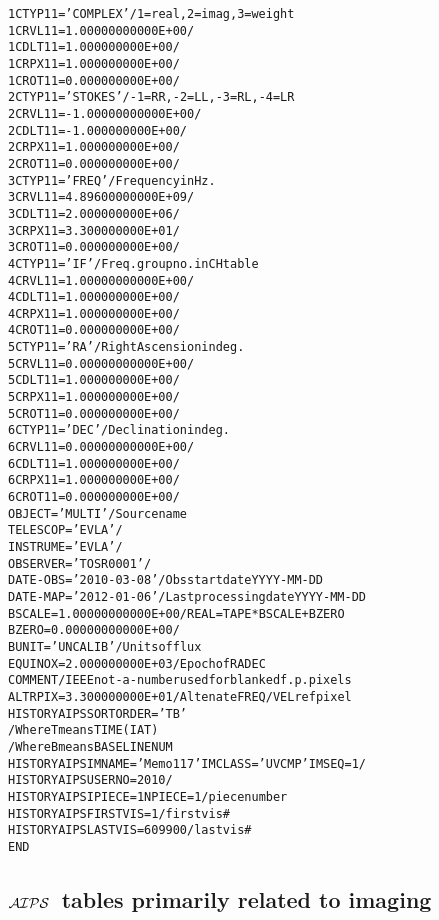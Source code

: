 \documentclass[twoside]{article}
\newcommand{\AIPS}{{$\cal AIPS\/$}}
\begin{document}
\begin{alltt}
1CTYP11 = 'COMPLEX '           / 1=real,2=imag,3=weight
1CRVL11 =    1.00000000000E+00 /
1CDLT11 =      1.000000000E+00 /
1CRPX11 =      1.000000000E+00 /
1CROT11 =      0.000000000E+00 /
2CTYP11 = 'STOKES  '           / -1=RR, -2=LL, -3=RL, -4=LR
2CRVL11 =   -1.00000000000E+00 /
2CDLT11 =     -1.000000000E+00 /
2CRPX11 =      1.000000000E+00 /
2CROT11 =      0.000000000E+00 /
3CTYP11 = 'FREQ    '           / Frequency in Hz.
3CRVL11 =    4.89600000000E+09 /
3CDLT11 =      2.000000000E+06 /
3CRPX11 =      3.300000000E+01 /
3CROT11 =      0.000000000E+00 /
4CTYP11 = 'IF      '           / Freq. group no. in CH table
4CRVL11 =    1.00000000000E+00 /
4CDLT11 =      1.000000000E+00 /
4CRPX11 =      1.000000000E+00 /
4CROT11 =      0.000000000E+00 /
5CTYP11 = 'RA      '           / Right Ascension in deg.
5CRVL11 =    0.00000000000E+00 /
5CDLT11 =      1.000000000E+00 /
5CRPX11 =      1.000000000E+00 /
5CROT11 =      0.000000000E+00 /
6CTYP11 = 'DEC     '           / Declination in deg.
6CRVL11 =    0.00000000000E+00 /
6CDLT11 =      1.000000000E+00 /
6CRPX11 =      1.000000000E+00 /
6CROT11 =      0.000000000E+00 /
OBJECT  = 'MULTI   '           / Source name
TELESCOP= 'EVLA    '           /
INSTRUME= 'EVLA    '           /
OBSERVER= 'TOSR0001'           /
DATE-OBS= '2010-03-08'         / Obs start date YYYY-MM-DD
DATE-MAP= '2012-01-06'         / Last processing date YYYY-MM-DD
BSCALE  =    1.00000000000E+00 / REAL = TAPE * BSCALE + BZERO
BZERO   =    0.00000000000E+00 /
BUNIT   = 'UNCALIB '           / Units of flux
EQUINOX =      2.000000000E+03 / Epoch of RA DEC
COMMENT / IEEE not-a-number used for blanked f.p. pixels
ALTRPIX =      3.300000000E+01 / Altenate FREQ/VEL ref pixel
HISTORY AIPS   SORT ORDER = 'TB'
              / Where T means TIME (IAT)
              / Where B means BASELINE NUM
HISTORY AIPS   IMNAME='Memo 117    ' IMCLASS='UVCMP ' IMSEQ=   1     /
HISTORY AIPS   USERNO= 2010            /
HISTORY AIPS   IPIECE= 1 NPIECE= 1     / piece number
HISTORY AIPS   FIRSTVIS=           1     / first vis #
HISTORY AIPS   LASTVIS =      609900     / last vis #
END
\end{alltt}

\subsection{\AIPS\ tables primarily related to imaging}
\end{document}
